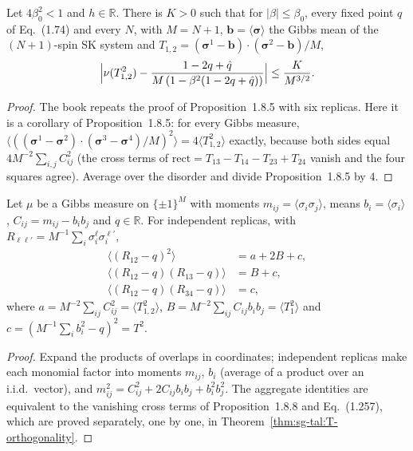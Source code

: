 \begin{theorem}
\label{thm:sg-tal:prop-187}
  \leanok
{}
Let $4\beta_0^2<1$ and $h\in\mathbb R$.  There is $K>0$ such that for $|\beta|\le\beta_0$, every fixed point $q$ of Eq.~(1.74) and every $N$, with $M=N+1$, $\mathbf b=\langle\boldsymbol\sigma\rangle$ the Gibbs mean of the $(N+1)$-spin SK system and $T_{1,2}=(\boldsymbol\sigma^1-\mathbf b)\cdot(\boldsymbol\sigma^2-\mathbf b)/M$,
\[
\Bigl|\nu(T_{1,2}^2)-\frac{1-2q+\hat q}{M\,(1-\beta^2(1-2q+\hat q))}\Bigr|\le \frac{K}{M^{3/2}}.
\]
\end{theorem}
\begin{proof}
  \leanok
The book repeats the proof of Proposition~1.8.5 with six replicas.  Here it is a corollary of Proposition~1.8.5: for every Gibbs measure, $\langle((\boldsymbol\sigma^1-\boldsymbol\sigma^2)\cdot(\boldsymbol\sigma^3-\boldsymbol\sigma^4)/M)^2\rangle=4\langle T_{1,2}^2\rangle$ exactly, because both sides equal $4M^{-2}\sum_{i,j}C_{ij}^2$ (the cross terms of $\mathrm{rect}=T_{13}-T_{14}-T_{23}+T_{24}$ vanish and the four squares agree).  Average over the disorder and divide Proposition~1.8.5 by $4$.
\end{proof}

\begin{theorem}
\label{thm:sg-tal:overlap-covariances-T}
  \leanok
{}
Let $\mu$ be a Gibbs measure on $\{\pm1\}^M$ with moments $m_{ij}=\langle\sigma_i\sigma_j\rangle$, means $b_i=\langle\sigma_i\rangle$, $C_{ij}=m_{ij}-b_ib_j$ and $q\in\mathbb R$.  For independent replicas, with $R_{\ell\ell'}=M^{-1}\sum_i\sigma^\ell_i\sigma^{\ell'}_i$,
\begin{align*}
\langle(R_{12}-q)^2\rangle&=a+2B+c,\\
\langle(R_{12}-q)(R_{13}-q)\rangle&=B+c,\\
\langle(R_{12}-q)(R_{34}-q)\rangle&=c,
\end{align*}
where $a=M^{-2}\sum_{ij}C_{ij}^2=\langle T_{1,2}^2\rangle$, $B=M^{-2}\sum_{ij}C_{ij}b_ib_j=\langle T_1^2\rangle$ and $c=(M^{-1}\sum_ib_i^2-q)^2=T^2$.
\end{theorem}
\begin{proof}
  \leanok
Expand the products of overlaps in coordinates; independent replicas make each monomial factor into moments $m_{ij}$, $b_i$ (average of a product over an i.i.d.\ vector), and $m_{ij}^2=C_{ij}^2+2C_{ij}b_ib_j+b_i^2b_j^2$.  The aggregate identities are equivalent to the vanishing cross terms of Proposition~1.8.8 and Eq.~(1.257), which are proved separately, one by one, in Theorem~\ref{thm:sg-tal:T-orthogonality}.
\end{proof}


